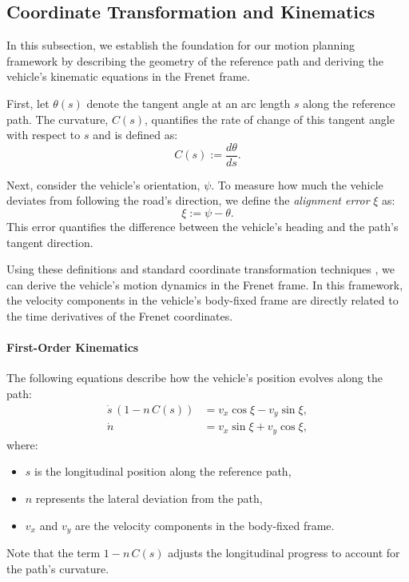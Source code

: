 
\subsection{Coordinate Transformation and Kinematics}

In this subsection, we establish the foundation for our motion planning framework by describing the geometry of the reference path and deriving the
vehicle's kinematic equations in the Frenet frame.

First, let \(\theta(s)\) denote the tangent angle at an arc length \(s\) along the reference path.
The curvature, \(C(s)\), quantifies the rate of change of this tangent angle with respect to \(s\) and is defined as:
\begin{equation}
	C(s) := \frac{d\theta}{ds}.
\end{equation}

Next, consider the vehicle's orientation, \(\psi\).
To measure how much the vehicle deviates from following the road's direction, we define the \emph{alignment error} \(\xi\) as:
\begin{equation}
	\xi := \psi - \theta.
\end{equation}
This error quantifies the difference between the vehicle's heading and the path's tangent direction.

Using these definitions and standard coordinate transformation techniques \cite{eilbrecht_challenges_2020}, we can derive the vehicle's motion
dynamics in the Frenet frame.
In this framework, the velocity components in the vehicle's body-fixed frame are directly related to the time derivatives of the Frenet coordinates.

\paragraph{First-Order Kinematics}\label{par:first_order_kinematics}
The following equations describe how the vehicle's position evolves along the path:
\begin{align}
	\dot{s}\,(1 - n\,C(s)) & = v_x\cos{\xi} - v_y\sin{\xi}, \label{eq:first_derivative_long} \\
	\dot{n}                & = v_x\sin{\xi} + v_y\cos{\xi}, \label{eq:first_derivative_lat}
\end{align}
where:
\begin{itemize}
	\item \(s\) is the longitudinal position along the reference path,
	\item \(n\) represents the lateral deviation from the path,
	\item \(v_x\) and \(v_y\) are the velocity components in the body-fixed frame.
\end{itemize}
Note that the term \(1 - n\,C(s)\) adjusts the longitudinal progress to account for the path's curvature.

